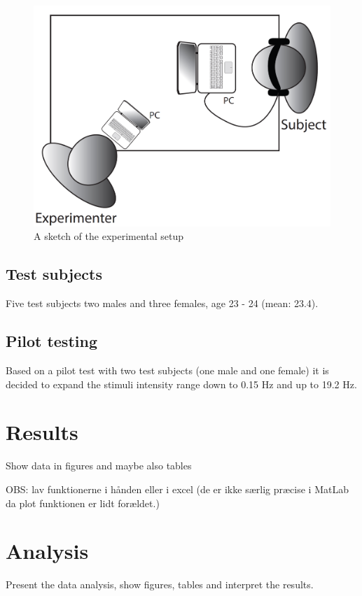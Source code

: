 \begin{figure}
\centering
\includegraphics[width = \textwidth]{Figure/Vores_Figurer/experiment.png} 
\caption{A sketch of the experimental setup}
\label{fig:experiment}
\end{figure}

\subsection*{Test subjects}
%
Five test subjects two males and three females, age 23 - 24 (mean: 23.4).

\subsection*{Pilot testing}
%
Based on a pilot test with two test subjects (one male and one female) it is decided to expand the stimuli intensity range down to 0.15 Hz and up to 19.2 Hz.

\section*{Results}
Show data in figures and maybe also tables

OBS: lav funktionerne i hånden eller i excel (de er ikke særlig præcise i MatLab da plot funktionen er lidt forældet.)

\section*{Analysis}
Present the data analysis, show figures, tables and interpret the results.

